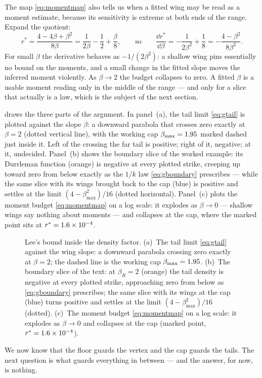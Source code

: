 The map \eqref{eq:momentmap} also tells us when a fitted wing may be
read as a moment estimate, because its sensitivity is extreme at both
ends of the range.  Expand the quotient:
\[
r^*=\frac{4-4\beta+\beta^2}{8\beta}
=\frac{1}{2\beta}-\frac12+\frac{\beta}{8},
\qquad\text{so}\qquad
\frac{\dd r^*}{\dd\beta}=-\frac{1}{2\beta^2}+\frac18
=-\frac{4-\beta^2}{8\beta^2}.
\]
For small $\beta$ the derivative behaves as $-1/(2\beta^2)$: a shallow
wing pins essentially no bound on the moments, and a small change in
the fitted slope moves the inferred moment violently.  As $\beta\to2$
the budget collapses to zero.  A fitted $\beta$ is a usable moment
reading only in the middle of the range --- and only for a slice that
actually is a law, which is the subject of the next section.

 draws the three parts of the argument.  In panel~(a),
the tail limit \eqref{eq:gtail} is plotted against the slope $\beta$: a
downward parabola that crosses zero exactly at $\beta=2$ (dotted
vertical line), with the working cap $\beta_{\max}=1.95$
marked dashed just inside it.  Left of the crossing the far tail is
positive; right of it, negative; at it, undecided.  Panel~(b) shows the
boundary slice of the worked example: its Durrleman function (orange)
is negative at every plotted strike, creeping up toward zero from below
exactly as the $1/k$ law \eqref{eq:gboundary} prescribes --- while the
same slice with its wings brought back to the cap (blue) is positive
and settles at the limit $(4-\beta_{\max}^2)/16$ (dotted horizontal).
Panel~(c) plots the moment budget \eqref{eq:momentmap} on a log scale:
it explodes as $\beta\to0$ --- shallow wings say nothing about moments
--- and collapses at the cap, where the marked point sits at
$r^*=1.6\times10^{-4}$.

\begin{figure}[htbp]
\centering
{}
\caption{Lee's bound inside the density factor.  (a)~The tail limit
\eqref{eq:gtail} against the wing slope: a downward parabola crossing
zero exactly at $\beta=2$; the dashed line is the working cap
$\beta_{\max}=1.95$.  (b)~The boundary slice of the text: at
$\beta_R=2$ (orange) the tail density is negative at every plotted
strike, approaching zero from below as \eqref{eq:gboundary} prescribes;
the same slice with its wings at the cap (blue) turns positive and
settles at the limit $(4-\beta_{\max}^2)/16$ (dotted).  (c)~The moment
budget \eqref{eq:momentmap} on a log scale: it explodes as $\beta\to0$
and collapses at the cap (marked point, $r^*=1.6\times10^{-4}$).}
\label{fig:svilee}
\end{figure}

We now know that the floor guards the vertex and the cap guards the
tails.  The next question is what guards everything in between --- and
the answer, for now, is nothing.
